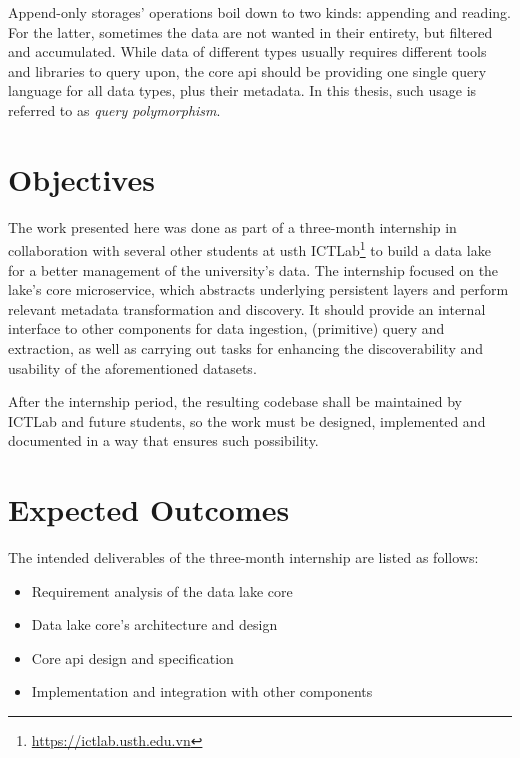 Append-only storages' operations boil down to two kinds: appending and reading.
For the latter, sometimes the data are not wanted in their entirety,
but filtered and accumulated.  While data of different types usually requires
different tools and libraries to query upon, the core \gls{api} should be
providing one single query language for all data types, plus their metadata.
In this thesis, such usage is referred to as \emph{query polymorphism}.

\section{Objectives}
The work presented here was done as part of a three-month internship
in collaboration with several other students
at \gls{usth} ICTLab\footnote{\url{https://ictlab.usth.edu.vn}} to build
a data lake for a better management of the university's data.  The internship
focused on the lake's core microservice, which abstracts underlying
persistent layers and perform relevant metadata transformation and discovery.
It should provide an internal interface to other components for data ingestion,
(primitive) query and extraction, as well as carrying out tasks for enhancing
the discoverability and usability of the aforementioned datasets.

After the internship period, the resulting codebase shall be maintained
by ICTLab and future students, so the work must be designed, implemented
and documented in a way that ensures such possibility.

\section{Expected Outcomes}
The intended deliverables of the three-month internship are listed as follows:
\begin{itemize}
  \item Requirement analysis of the data lake core
  \item Data lake core's architecture and design
  \item Core \gls{api} design and specification
  \item Implementation and integration with other components
\end{itemize}
